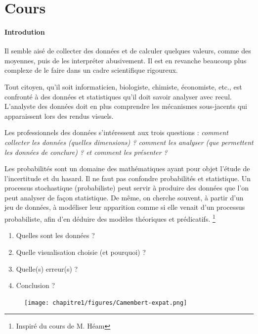 \documentclass[10pt, a4paper]{article}
\begin{document}



\newpage
\normalsize
\section{Cours}
\paragraph{Introdution}
Il semble aisé de collecter des données et de calculer quelques valeurs, comme des moyennes, 
puis de les interpréter abusivement. Il est en revanche beaucoup plus complexe de le faire dans un cadre scientifique rigoureux.

 Tout citoyen, qu’il soit informaticien, biologiste, chimiste, économiste, etc., est confronté à des données et statistiques qu’il doit savoir analyser avec recul. L'analyste des données doit en plus comprendre les mécanismes sous-jacents qui apparaissent lors des rendus visuels. 

Les professionnels des données s'intéressent aux trois questions :\textit{ comment collecter les données (quelles dimensions) ? comment les analyser (que permettent les données de conclure) ? et comment les présenter ?}


Les probabilités sont un domaine des mathématiques ayant pour objet l’étude de l’incertitude et du hasard. Il
ne faut pas confondre probabilités et statistique. Un processus stochastique (probabiliste) peut servir à produire des
données que l’on peut analyser de façon statistique. De même, on cherche souvent, à partir d’un jeu de données, à
modéliser leur apparition comme si elle venait d’un processus probabiliste, afin d’en déduire des modèles théoriques
et prédicatifs. \footnote{Inspiré du cours de M. Héam}




\begin{tcolorbox}[lefttitle=2cm,colback=white, colframe=gray!75!black, title=\textbf{Analyse d'une datavisualisation issue d'un reportage de France3}]
\begin{enumerate}
    \item Quelles sont les données ?
    \item Quelle visualisation choisie (et pourquoi) ?
    \item Quelle(s) erreur(s) ?
    \item Conclusion ?
\end{enumerate}

\begin{figure}[H]
    \texttt{[image: chapitre1/figures/Camembert-expat.png]}
    \label{fig:France3}
\end{figure}
\vspace{3.5cm}


\end{tcolorbox}
\end{document}
